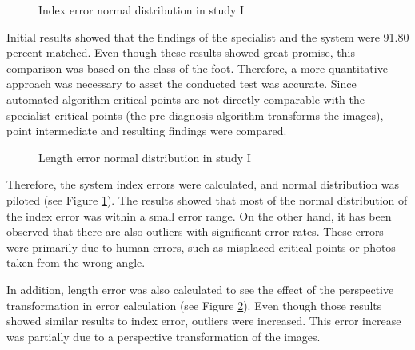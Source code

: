 \begin{figure}[htbp]
\centering
{}
\caption{Index error normal distribution in study I}
\label{fig:StudyIIndexErrorNormalDists}
\end{figure}

Initial results showed that the findings of the specialist and the system were 91.80 percent matched. Even though these results showed great promise, this comparison was based on the class of the foot. Therefore, a more quantitative approach was necessary to asset the conducted test was accurate. Since automated algorithm critical points are not directly comparable with the specialist critical points (the pre-diagnosis algorithm transforms the images), point intermediate and resulting findings were compared.

\begin{figure}[htbp]
\centering
{}
\caption{Length error normal distribution in study I}
\label{fig:StudyILenghtErrorNormalDists}
\end{figure}

Therefore, the system index errors were calculated, and normal distribution was piloted (see Figure \ref{fig:StudyIIndexErrorNormalDists}). The results showed that most of the normal distribution of the index error was within a small error range. On the other hand, it has been observed that there are also outliers with significant error rates. These errors were primarily due to human errors, such as misplaced critical points or photos taken from the wrong angle. 

In addition, length error was also calculated to see the effect of the perspective transformation in error calculation (see Figure \ref{fig:StudyILenghtErrorNormalDists}). Even though those results showed similar results to index error, outliers were increased. This error increase was partially due to a perspective transformation of the images.
